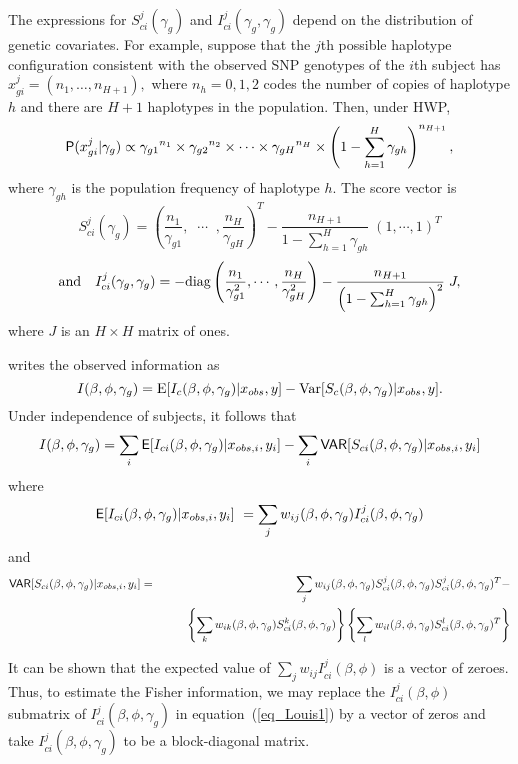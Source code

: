 \documentclass[article, shortnames]{jss}
\begin{document}
The expressions for
 $S^j_{ci}(\gamma_g)$ and $I^j_{ci}(\gamma_g,\gamma_g)$ depend on the
distribution of genetic covariates.
For example, suppose that the $j$th
possible haplotype configuration consistent with
the observed SNP genotypes of the $i$th subject has
$x_{gi}^j = (n_1, \ldots, n_{H+1}),$ where
$n_h=0,1,2$ codes the number of copies of haplotype $h$
and there are $H+1$ haplotypes in the population.
Then, under HWP,
$$\mathsf{P}(x_{gi}^j | \gamma_g) \propto
{\gamma_{g1}}^{n_1} \times
{\gamma_{g2}}^{n_2} \times \cdots \times
{\gamma_{gH}}^{n_H} \times
\left( 1- \sum_{h=1}^{H} \gamma_{gh} \right ) ^{n_{H+1}},$$
where $\gamma_{gh}$ is the population frequency of haplotype $h$.
The score vector is
$$
S^j_{ci}(\gamma_g) = \left ( \frac{n_1}{\gamma_{g1}}, \;\; \cdots \;\;,
\frac{n_H}{\gamma_{gH}} \right )^T
- \frac{n_{H+1}} {1- \sum_{h=1}^{H} \gamma_{gh}}
\;\left ( 1, \cdots, 1 \right )^T
$$ 
$$
\mbox{and} \quad I^j_{ci}(\gamma_g,\gamma_g) = -{\rm diag} \left (
\frac{n_1}{\gamma_{g1}^2},
\cdots,
\frac{n_{H}}{\gamma_{gH}^2} \right ) -
\frac{n_{H+1}}{ \left(1- \sum_{h=1}^{H} \gamma_{gh}\right )^2} \; J,
$$
where $J$ is an $H \times H$ matrix of ones.

\citet{Louis82} writes the observed information as
$$
       I(\beta, \phi, \gamma_g) =
{\rm E}[I_c(\beta, \phi, \gamma_g ) | x_{obs}, y] -
                       {\rm Var}[S_c(\beta,\phi,\gamma_g) | x_{obs}, y].
$$
Under independence of subjects, it follows that
$$
I(\beta, \phi, \gamma_g) =
 \sum_i \mathsf{E}[I_{ci}(\beta, \phi, \gamma_g ) | x_{obs,i}, y_i] -
         \sum_i \mathsf{VAR}[S_{ci}(\beta,\phi, \gamma_g) | x_{obs,i}, y_i]
$$
where
\begin{equation}
\mathsf{E}[I_{ci}(\beta,\phi, \gamma_g ) | x_{obs,i}, y_i] \
     = \sum_j w_{ij}(\beta,\phi,\gamma_g) I^j_{ci}(\beta,\phi, \gamma_g )
\label{eq_Louis1}
\end{equation}
and
\begin{eqnarray*}
\mathsf{VAR}[S_{ci}(\beta,\phi,\gamma_g) | x_{obs,i}, y_i] &=&
\sum_j w_{ij}(\beta,\phi,\gamma_g) S^j_{ci}(\beta,\phi,\gamma_g)
                              S^j_{ci}(\beta,\phi,\gamma_g)^T  - \\
& &  \qquad \left\{ \sum_k w_{ik}(\beta,\phi,\gamma_g)
S^k_{ci}(\beta,\phi,\gamma_g) \right\}
    \left\{ \sum_l w_{il}(\beta,\phi,\gamma_g)
S^l_{ci}(\beta,\phi,\gamma_g)^T \right\}
\end{eqnarray*}
\citep{LipsitzIbrahim96, Burkett02}

It can be shown that the expected value of
$ \sum_j w_{ij}  I^j_{ci}(\beta,\phi)$ is a vector of zeroes.
Thus, to estimate the Fisher information,
we may replace the $I^j_{ci}(\beta,\phi)$ submatrix of
$I^j_{ci}(\beta,\phi,\gamma_g)$
in
equation~(\ref{eq_Louis1}) by a vector of zeros and take
$I^j_{ci}(\beta, \phi, \gamma_g)$ to be a block-diagonal
matrix.
\end{document}
